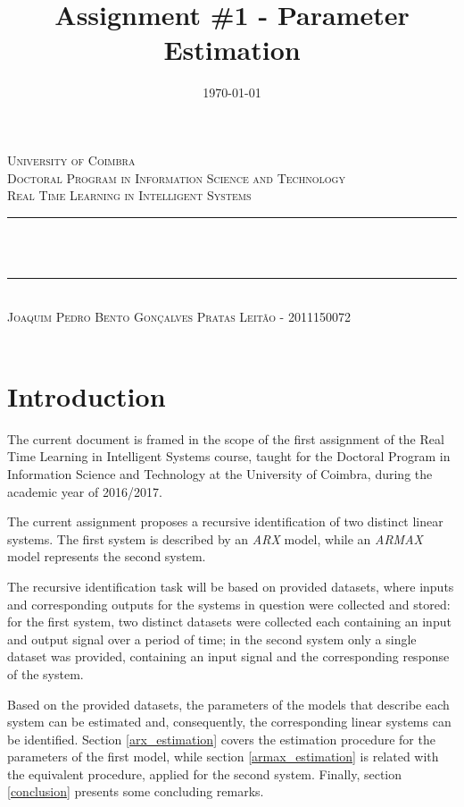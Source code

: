 \documentclass[12pt]{article}
\title{Assignment \#1 - Parameter Estimation}
\date{\today}
\makeatletter
\let\thetitle\@title
\let\thedate\@date
\makeatother
\begin{document}

\begin{titlepage}
	\centering
    \textsc{\LARGE University of Coimbra}\\[1.0 cm]
	\textsc{\large Doctoral Program in Information Science and Technology}\\[0.5 cm]
    \textsc{\large Real Time Learning in Intelligent Systems}\\[5 cm]
	\rule{\linewidth}{0.2 mm} \\[0.4 cm]
	{ \LARGE \bfseries \thetitle}\\ [0.2 cm]
    \rule{\linewidth}{0.2 mm} \\[3 cm]
    
    \textsc{Joaquim Pedro Bento Gonçalves Pratas Leitão - 2011150072}\\[5 cm]
	
	{\large \thedate}\\[2 cm]
 
	\vfill
	
\end{titlepage}


\section{Introduction}

The current document is framed in the scope of the first assignment of the Real Time Learning in Intelligent Systems course, taught for the Doctoral Program in Information Science and Technology at the University of Coimbra, during the academic year of 2016/2017. 

The current assignment proposes a recursive identification of two distinct linear systems. The first system is described by an \emph{ARX} model, while an \emph{ARMAX} model represents the second system.

The recursive identification task will be based on provided datasets, where inputs and corresponding outputs for the systems in question were collected and stored: for the first system, two distinct datasets were collected each containing an input and output signal over a period of time; in the second system only a single dataset was provided, containing an input signal and the corresponding response of the system.

Based on the provided datasets, the parameters of the models that describe each system can be estimated and, consequently, the corresponding linear systems can be identified. Section \ref{arx_estimation} covers the estimation procedure for the parameters of the first model, while section \ref{armax_estimation} is related with the equivalent procedure, applied for the second system. Finally, section \ref{conclusion} presents some concluding remarks.
\end{document}
